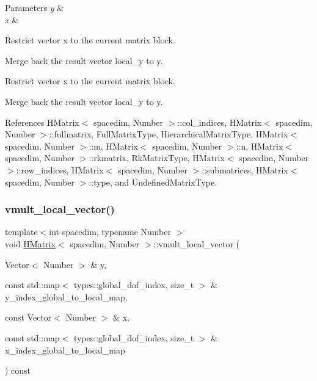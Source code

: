 \begin{DoxyParams}{Parameters}
{\em y} & \\
\hline
{\em x} & \\
\hline
\end{DoxyParams}
Restrict vector x to the current matrix block.

Merge back the result vector {\ttfamily local\+\_\+y} to {\ttfamily y}.

Restrict vector x to the current matrix block.

Merge back the result vector {\ttfamily local\+\_\+y} to {\ttfamily y}.

References H\+Matrix$<$ spacedim, Number $>$\+::col\+\_\+indices, H\+Matrix$<$ spacedim, Number $>$\+::fullmatrix, Full\+Matrix\+Type, Hierarchical\+Matrix\+Type, H\+Matrix$<$ spacedim, Number $>$\+::m, H\+Matrix$<$ spacedim, Number $>$\+::n, H\+Matrix$<$ spacedim, Number $>$\+::rkmatrix, Rk\+Matrix\+Type, H\+Matrix$<$ spacedim, Number $>$\+::row\+\_\+indices, H\+Matrix$<$ spacedim, Number $>$\+::submatrices, H\+Matrix$<$ spacedim, Number $>$\+::type, and Undefined\+Matrix\+Type.

\mbox{\label{classHMatrix_a2afddab534366617b6be203b3c5238a6}} 
\subsubsection{\texorpdfstring{vmult\+\_\+local\+\_\+vector()}{vmult\_local\_vector()}}
{\footnotesize\ttfamily template$<$int spacedim, typename Number $>$ \\
void \hyperlink{classHMatrix}{H\+Matrix}$<$ spacedim, Number $>$\+::vmult\+\_\+local\+\_\+vector (\begin{DoxyParamCaption}\item[{Vector$<$ Number $>$ \&}]{y,  }\item[{const std\+::map$<$ types\+::global\+\_\+dof\+\_\+index, size\+\_\+t $>$ \&}]{y\+\_\+index\+\_\+global\+\_\+to\+\_\+local\+\_\+map,  }\item[{const Vector$<$ Number $>$ \&}]{x,  }\item[{const std\+::map$<$ types\+::global\+\_\+dof\+\_\+index, size\+\_\+t $>$ \&}]{x\+\_\+index\+\_\+global\+\_\+to\+\_\+local\+\_\+map }\end{DoxyParamCaption}) const}

